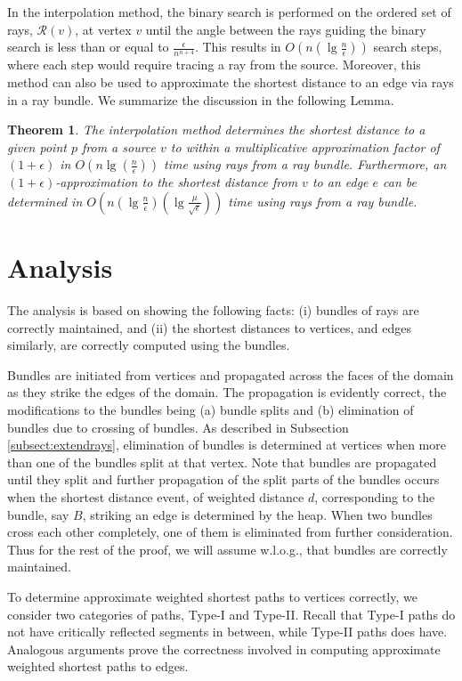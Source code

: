 \documentclass[11pt]{article}
\def\calR{\mathcal{R}}
\newtheorem{theorem}{Theorem}[section]
\begin{document}
In the interpolation method, the binary search is performed on the ordered set of rays, $\calR (v)$, at vertex $v$ until the angle between the rays guiding the binary search is less than or equal to $\frac{\epsilon}{n^{n+4}}$.
This results in $O(n (\lg \frac{n}{\epsilon}))$ search steps, where each step would require tracing a ray from the source.
Moreover, this method can also be used to approximate the shortest distance to an edge via rays in a ray bundle.
We summarize the discussion in the following Lemma.
\begin{theorem}
\label{thm:interpol}
The interpolation method determines the shortest distance to a given point $p$ from a source $v$ to within a multiplicative approximation factor of $(1+\epsilon)$ in $O(n\lg(\frac{n}{\epsilon}))$ time using rays from a ray bundle. 
Furthermore, an $(1+\epsilon)$-approximation to the shortest distance from $v$ to an edge $e$  can be determined in $O(n(\lg{\frac{n}{\epsilon}})(\lg{\frac{\mu}{\sqrt{\epsilon}}}))$ time using rays from a ray bundle.
\end{theorem}

\section{Analysis}
\label{sect:analysis}

The analysis is based on showing the following facts:
(i) bundles of rays are correctly maintained, and
(ii) the shortest distances to vertices, and edges similarly, are correctly computed using the bundles. 

Bundles are initiated from vertices and propagated across the faces of the domain as they strike the 
edges of the domain. The propagation is evidently correct, the modifications to the bundles
being (a) bundle splits and (b) elimination of bundles due to crossing of bundles.
As described in Subsection \ref{subsect:extendrays}, elimination of bundles is
determined at vertices when more than one of the bundles split at that vertex.
Note that bundles are propagated until they split and further propagation of the split parts of the bundles occurs when the shortest distance event, of weighted distance $d$, corresponding to the bundle, say $B$,  striking an edge is determined by the heap. 
When two bundles cross each other completely, one of them is eliminated from further consideration.
Thus for the rest of the proof, we will assume w.l.o.g., that bundles are correctly maintained.

To determine approximate weighted shortest paths to vertices correctly, we consider two categories of paths, Type-I and Type-II. 
Recall that Type-I paths do not have critically reflected segments in between, while Type-II paths does have. 
Analogous arguments prove the correctness involved in computing approximate weighted shortest paths to edges.
\end{document}
